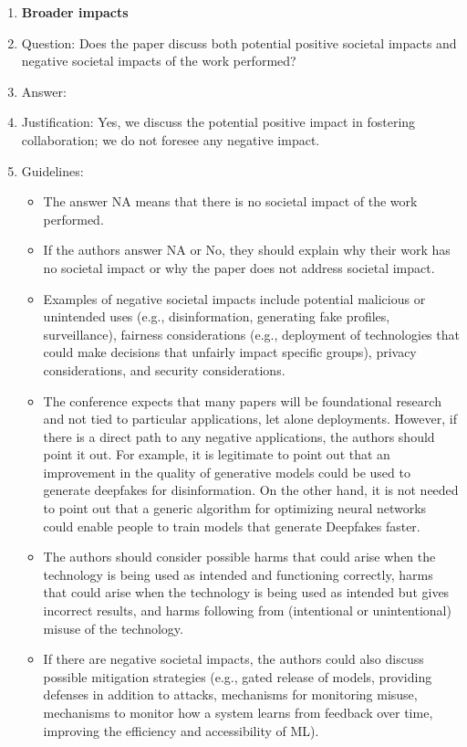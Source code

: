 \documentclass{article}
\begin{document}
\begin{enumerate}
\item {\bf Broader impacts}
    \item[] Question: Does the paper discuss both potential positive societal impacts and negative societal impacts of the work performed?
    \item[] Answer: \answerYes{} %
    \item[] Justification: Yes, we discuss the potential positive impact in fostering collaboration; we do not foresee any negative impact.
    \item[] Guidelines:
    \begin{itemize}
        \item The answer NA means that there is no societal impact of the work performed.
        \item If the authors answer NA or No, they should explain why their work has no societal impact or why the paper does not address societal impact.
        \item Examples of negative societal impacts include potential malicious or unintended uses (e.g., disinformation, generating fake profiles, surveillance), fairness considerations (e.g., deployment of technologies that could make decisions that unfairly impact specific groups), privacy considerations, and security considerations.
        \item The conference expects that many papers will be foundational research and not tied to particular applications, let alone deployments. However, if there is a direct path to any negative applications, the authors should point it out. For example, it is legitimate to point out that an improvement in the quality of generative models could be used to generate deepfakes for disinformation. On the other hand, it is not needed to point out that a generic algorithm for optimizing neural networks could enable people to train models that generate Deepfakes faster.
        \item The authors should consider possible harms that could arise when the technology is being used as intended and functioning correctly, harms that could arise when the technology is being used as intended but gives incorrect results, and harms following from (intentional or unintentional) misuse of the technology.
        \item If there are negative societal impacts, the authors could also discuss possible mitigation strategies (e.g., gated release of models, providing defenses in addition to attacks, mechanisms for monitoring misuse, mechanisms to monitor how a system learns from feedback over time, improving the efficiency and accessibility of ML).
    \end{itemize}
    

\end{enumerate}
\end{document}

